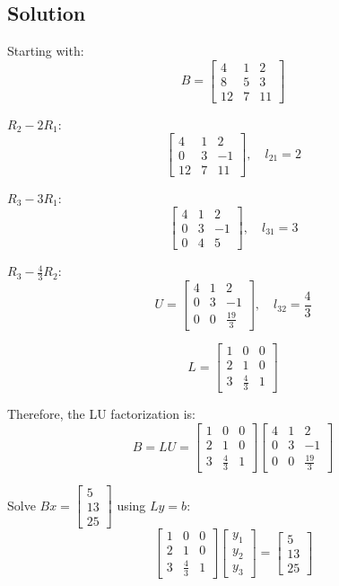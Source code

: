 \subsection*{Solution}

Starting with:
\[
	B = \begin{bmatrix}
		4 & 1 & 2 \\
		8 & 5 & 3 \\
		12 & 7 & 11
	\end{bmatrix}
\]

$R_2 - 2R_1$:
\[
	\begin{bmatrix}
		4 & 1 & 2 \\
		0 & 3 & -1 \\
		12 & 7 & 11
	\end{bmatrix}, \quad l_{21} = 2
\]

$R_3 - 3R_1$:
\[
	\begin{bmatrix}
		4 & 1 & 2 \\
		0 & 3 & -1 \\
		0 & 4 & 5
	\end{bmatrix}, \quad l_{31} = 3
\]

$R_3 - \frac{4}{3}R_2$:
\[
	U = \begin{bmatrix}
		4 & 1 & 2 \\
		0 & 3 & -1 \\
		0 & 0 & \frac{19}{3}
	\end{bmatrix}, \quad l_{32} = \frac{4}{3}
\]

\[
	L = \begin{bmatrix}
		1 & 0 & 0 \\
		2 & 1 & 0 \\
		3 & \frac{4}{3} & 1
	\end{bmatrix}
\]

Therefore, the LU factorization is:
\[
	B = LU = \begin{bmatrix}
		1 & 0 & 0 \\
		2 & 1 & 0 \\
		3 & \frac{4}{3} & 1
	\end{bmatrix} \begin{bmatrix}
		4 & 1 & 2 \\
		0 & 3 & -1 \\
		0 & 0 & \frac{19}{3}
	\end{bmatrix}
\]

Solve $Bx = \begin{bmatrix} 5 \\ 13 \\ 25 \end{bmatrix}$ using $Ly = b$:
\[
	\begin{bmatrix}
		1 & 0 & 0 \\
		2 & 1 & 0 \\
		3 & \frac{4}{3} & 1
	\end{bmatrix} \begin{bmatrix}
		y_1 \\ y_2 \\ y_3
	\end{bmatrix} = \begin{bmatrix}
		5 \\ 13 \\ 25
	\end{bmatrix}
\]

